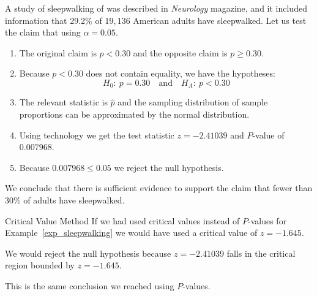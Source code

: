 \documentclass{beamer}
\newcommand{\nullhypothesis}[1]{H_0:~{#1}}
\newcommand{\althypothesis}[1]{H_A:~{#1}}
\begin{document}
\begin{frame}
\begin{example}\label{exp_sleepwalking}
A study of sleepwalking of  was described in \emph{Neurology} magazine, and it included information that 29.2\% of $19,136$ American adults have sleepwalked. Let us test the claim that  using $\alpha=0.05$.\pause

\vspace{1mm}
\begin{enumerate}
\item The original claim is $p<0.30$ and the opposite claim is $p\geq0.30$.\pause
\item Because $p<0.30$ does not contain equality, we have the hypotheses:
\vspace{-2mm}
\begin{equation*}
\nullhypothesis{p=0.30} 
\quad\text{and}\quad
\althypothesis{p<0.30}
\end{equation*}\pause
\vspace{-8mm}
\item The relevant statistic is $\hat{p}$ and the sampling distribution of sample proportions can be approximated by the normal distribution.\pause
\item Using technology we get the test statistic $z=-2.41039$ and $P$-value of $0.007968$.\pause
\item Because $0.007968\leq0.05$ we reject the null hypothesis.\pause
\end{enumerate}
We conclude that there is sufficient evidence to support the claim that fewer than 30\% of adults have sleepwalked.
\end{example}
\end{frame}

\begin{frame}
\begin{block}{Critical Value Method}
If we had used critical values instead of $P$-values for Example~\ref{exp_sleepwalking} we would have used a critical value of $z=-1.645$.\pause

\vspace{1mm}
We would reject the null hypothesis because $z=-2.41039$ falls in the critical region bounded by $z=-1.645$.
\end{block}\pause
\begin{note}
This is the same conclusion we reached using $P$-values.
\end{note}
\end{frame}
\end{document}
